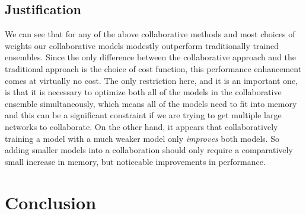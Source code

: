 \documentclass[english,a4paper,oneside]{amsart}
\theoremstyle{definition}
\begin{document}


\subsection{Justification}
We can see that for any of the above collaborative methods and most choices of weights our collaborative models modestly outperform traditionally trained ensembles. Since the only difference between the collaborative approach and the traditional approach is the choice of cost function, this performance enhancement comes at virtually no cost. The only restriction here, and it is an important one, is that it is necessary to optimize both all of the models in the collaborative ensemble simultaneously, which means all of the models need to fit into memory and this can be a significant constraint if we are trying to get multiple large networks to collaborate. On the other hand, it appears that collaboratively training a model with a much weaker model only \emph{improves} both models. So adding smaller models into a collaboration should only require a comparatively small increase in memory, but noticeable improvements in performance. %


\section{Conclusion}
\end{document}
